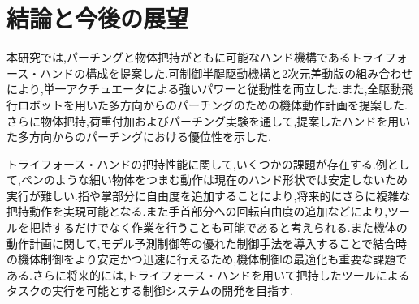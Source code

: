 \documentclass{jarticle}
\begin{document}
\section{結論と今後の展望}
本研究では,パーチングと物体把持がともに可能なハンド機構であるトライフォース・ハンドの構成を提案した.可制御半腱駆動機構と2次元差動版の組み合わせにより,単一アクチュエータによる強いパワーと従動性を両立した.また,全駆動飛行ロボットを用いた多方向からのパーチングのための機体動作計画を提案した.さらに物体把持,荷重付加およびパーチング実験を通して,提案したハンドを用いた多方向からのパーチングにおける優位性を示した.

トライフォース・ハンドの把持性能に関して,いくつかの課題が存在する.例として,ペンのような細い物体をつまむ動作は現在のハンド形状では安定しないため実行が難しい.指や掌部分に自由度を追加することにより,将来的にさらに複雑な把持動作を実現可能となる.また手首部分への回転自由度の追加などにより,ツールを把持するだけでなく作業を行うことも可能であると考えられる.また機体の動作計画に関して,モデル予測制御等の優れた制御手法を導入することで結合時の機体制御をより安定かつ迅速に行えるため,機体制御の最適化も重要な課題である.さらに将来的には,トライフォース・ハンドを用いて把持したツールによるタスクの実行を可能とする制御システムの開発を目指す.

\footnotesize





\normalsize
\end{document}
